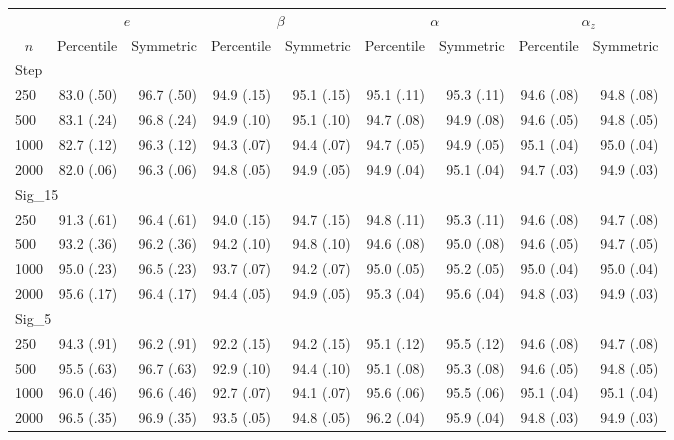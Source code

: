 \documentclass{article}
\begin{document}
\begin{tabular}{lrrrrrrrr}
   \hline
 
       &  \multicolumn{2}{c}{$e$}    & \multicolumn{2}{c}{$\beta$}  & \multicolumn{2}{c}{$\alpha$}  & \multicolumn{2}{c}{$\alpha_z$} \\ 
         \multicolumn{1}{c}{$n$} & \multicolumn{1}{c}{Percentile}& \multicolumn{1}{c}{Symmetric}& \multicolumn{1}{c}{Percentile}& \multicolumn{1}{c}{Symmetric}& \multicolumn{1}{c}{Percentile}& \multicolumn{1}{c}{Symmetric}& \multicolumn{1}{c}{Percentile}& \multicolumn{1}{c}{Symmetric} \\ 
         \hline   
 \multicolumn{9}{l}{Step} \\ 
250 & 83.0 (.50) & 96.7 (.50) & 94.9 (.15) & 95.1 (.15) & 95.1 (.11) & 95.3 (.11) & 94.6 (.08) & 94.8 (.08) \\ 
  500 & 83.1 (.24) & 96.8 (.24) & 94.9 (.10) & 95.1 (.10) & 94.7 (.08) & 94.9 (.08) & 94.6 (.05) & 94.8 (.05) \\ 
  1000 & 82.7 (.12) & 96.3 (.12) & 94.3 (.07) & 94.4 (.07) & 94.7 (.05) & 94.9 (.05) & 95.1 (.04) & 95.0 (.04) \\ 
  2000 & 82.0 (.06) & 96.3 (.06) & 94.8 (.05) & 94.9 (.05) & 94.9 (.04) & 95.1 (.04) & 94.7 (.03) & 94.9 (.03) \\ 
       \hline   
 \multicolumn{9}{l}{Sig\_15} \\ 
250 & 91.3 (.61) & 96.4 (.61) & 94.0 (.15) & 94.7 (.15) & 94.8 (.11) & 95.3 (.11) & 94.6 (.08) & 94.7 (.08) \\ 
  500 & 93.2 (.36) & 96.2 (.36) & 94.2 (.10) & 94.8 (.10) & 94.6 (.08) & 95.0 (.08) & 94.6 (.05) & 94.7 (.05) \\ 
  1000 & 95.0 (.23) & 96.5 (.23) & 93.7 (.07) & 94.2 (.07) & 95.0 (.05) & 95.2 (.05) & 95.0 (.04) & 95.0 (.04) \\ 
  2000 & 95.6 (.17) & 96.4 (.17) & 94.4 (.05) & 94.9 (.05) & 95.3 (.04) & 95.6 (.04) & 94.8 (.03) & 94.9 (.03) \\ 
       \hline   
 \multicolumn{9}{l}{Sig\_5} \\ 
250 & 94.3 (.91) & 96.2 (.91) & 92.2 (.15) & 94.2 (.15) & 95.1 (.12) & 95.5 (.12) & 94.6 (.08) & 94.7 (.08) \\ 
  500 & 95.5 (.63) & 96.7 (.63) & 92.9 (.10) & 94.4 (.10) & 95.1 (.08) & 95.3 (.08) & 94.6 (.05) & 94.8 (.05) \\ 
  1000 & 96.0 (.46) & 96.6 (.46) & 92.7 (.07) & 94.1 (.07) & 95.6 (.06) & 95.5 (.06) & 95.1 (.04) & 95.1 (.04) \\ 
  2000 & 96.5 (.35) & 96.9 (.35) & 93.5 (.05) & 94.8 (.05) & 96.2 (.04) & 95.9 (.04) & 94.8 (.03) & 94.9 (.03) \\ 

\end{tabular}
\end{document}
